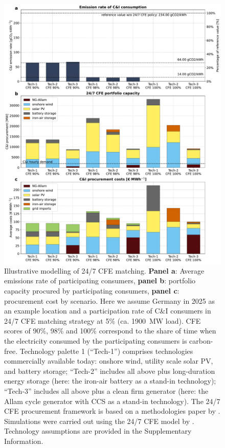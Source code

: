 \documentclass[pdflatex,sn-basic, Numbered]{sn-jnl}
\theoremstyle{thmstyleone}%
\theoremstyle{thmstyletwo}%
\theoremstyle{thmstylethree}%
\begin{document}
\begin{figure}[htbp]
    \centering
    \includegraphics[width=\textwidth]{images/dashboard_247CFE.pdf}
    \captionsetup{width=\textwidth}
    \caption{Illustrative modelling of 24/7 CFE matching.
    \textbf{Panel a}: Average emissions rate of participating consumers,
    \textbf{panel b}: portfolio capacity procured by participating consumers,
    \textbf{panel c}: procurement cost by scenario.
    Here we assume Germany in 2025 as an example location and a participation rate of C\&I consumers in 24/7 CFE matching strategy at 5\% (ca. 1900~MW load).
    CFE scores of 90\%, 98\% and 100\% correspond to the share of time when the electricity consumed by the participating consumers is carbon-free.
    Technology palette 1 (\enquote{Tech-1}) comprises technologies commercially available today: onshore wind, utility scale solar PV, and battery storage; \enquote{Tech-2} includes all above plus long-duration energy storage (here: the iron-air battery as a stand-in technology); \enquote{Tech-3} includes all above plus a clean firm generator (here: the Allam cycle generator with CCS as a stand-in technology). The 24/7 CFE procurement framework is based on a methodologies paper by \citet{google-methodologies}. Simulations were carried out using the 24/7 CFE model by \citet{riepinMeansCostsSystemlevel2024}. Technology assumptions are provided in the Supplementary Information.\\
    }\label{fig:dashboard}
\end{figure}
\end{document}

